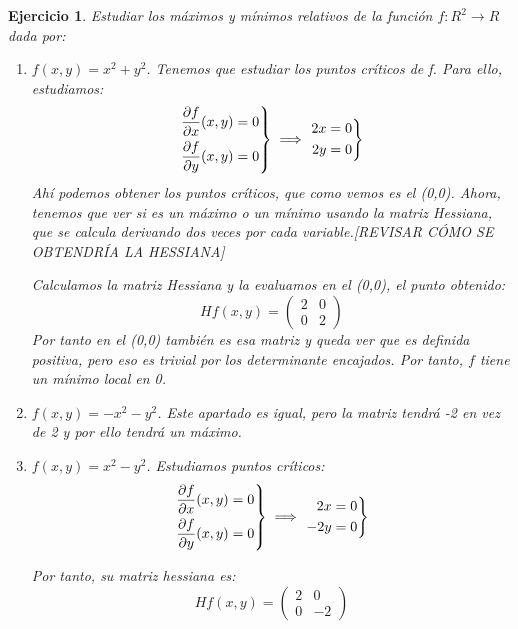 \documentclass[11pt, a4paper, titlepage]{article}
\theoremstyle{exercise-style}
\newtheorem*{ejer}{Ejercicio}
\theoremstyle{theorem-style}
\newenvironment{rcases}
  {\left.\begin{aligned}}
  {\end{aligned}\right\rbrace}
\begin{document}
\begin{ejer}
	Estudiar los máximos y mínimos relativos de la función $f: R^2 \to R$ dada por:
	\begin{enumerate}
	
	\item $f(x,y)=x^2+y^2$. Tenemos que estudiar los puntos críticos de f. Para ello, estudiamos:
	\[
	\begin{rcases}
	\frac{\partial f}{\partial x}(x,y) = 0\\
	\frac{\partial f}{\partial y}(x,y) = 0
\end{rcases} \implies \begin{rcases}
	2x= 0\\
	2y = 0\\
\end{rcases}
	\]
	Ahí podemos obtener los puntos críticos, que como vemos es el (0,0). Ahora, tenemos que ver si es un máximo o un mínimo usando la matriz Hessiana, que se calcula derivando dos veces por cada variable.[REVISAR CÓMO SE OBTENDRÍA LA HESSIANA]
	
	Calculamos la matriz Hessiana y la evaluamos en el (0,0), el punto obtenido:
	\[
	Hf(x,y) = \begin{pmatrix} 2 & 0 \\ 0 & 2 \end{pmatrix} 
	\]
	Por tanto en el (0,0) también es esa matriz y queda ver que es definida positiva, pero eso es trivial por los determinante encajados. Por tanto, $f$ tiene un mínimo local en 0.
	
	\item $f(x,y) = -x^2-y^2$. Este apartado es igual, pero la matriz tendrá -2 en vez de 2 y por ello tendrá un máximo.
	
	\item $f(x,y) = x^2-y^2$. Estudiamos puntos críticos:
	\[
	\begin{rcases}
	\frac{\partial f}{\partial x}(x,y) = 0\\
	\frac{\partial f}{\partial y}(x,y) = 0
\end{rcases} \implies \begin{rcases}
	2x= 0\\
	-2y = 0\\
\end{rcases}
	\]
	
	Por tanto, su matriz hessiana es:
		\[
	Hf(x,y) = \begin{pmatrix} 2 & 0 \\ 0 & -2 \end{pmatrix} 
	\]
	

\end{enumerate}
\end{ejer}
\end{document}
